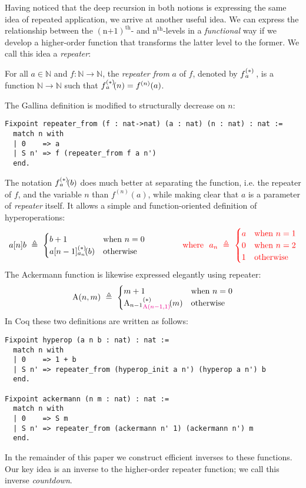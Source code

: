 Having noticed that the deep recursion in both notions is expressing the same idea
of repeated application, we arrive at another useful idea. We can express the relationship
between the $(\text{n+1})^{\text{th}}$- and $\text{n}^{\text{th}}$-levels in
a \emph{functional} way if we develop a higher-order function that transforms the latter level
to the former.  We call this idea a \emph{repeater}:
\begin{defn}
For all $a\in \mathbb{N}$ and $f: \mathbb{N}\to \mathbb{N}$, the \emph{repeater from} $a$ of $f$, denoted by $\rf{f}{a}$ , is a function $\mathbb{N}\to \mathbb{N}$ such that $\rf{f}{a}(n) = f^{(n)}(a)$.
\end{defn}
The Gallina definition is modified to structurally decrease on $n$:
\begin{lstlisting}
Fixpoint repeater_from (f : nat->nat) (a : nat) (n : nat) : nat :=
  match n with
  | 0    => a
  | S n' => f (repeater_from f a n')
  end.
\end{lstlisting}
The notation $\rf{f}{a}(b)$ does much better at separating the function, i.e. the repeater of $f$, and the variable $n$ than $f^{(n)}(a)$, while making clear that $a$ is a parameter of \emph{repeater} itself. It allows a simple and function-oriented definition of hyperoperations:
\begin{equation*}
a[n]b ~ \triangleq ~ \begin{cases}
b + 1 & \text{when } n = 0 \\
\rf{a[n-1]}{a_n}(b) & \text{otherwise}
\end{cases}
{\color{red}\qquad \qquad \text{ where } \ a_n ~ \triangleq ~ \begin{cases}
a & \text{when } n = 1 \\
0 & \text{when } n = 2 \\
1 & \text{otherwise}
\end{cases}}
\end{equation*}
The Ackermann function is likewise expressed elegantly using repeater:
\begin{equation*}
\Ack(n,m) ~ \triangleq ~ \begin{cases}
m + 1 & \text{when } n = 0 \\
\rf{\Ack_{n-1}}{\color{magenta}\Ack(n-1,1)}(m) & \text{otherwise}
\end{cases}
\end{equation*}
In Coq these two definitions are written as follows:
\begin{lstlisting}
Fixpoint hyperop (a n b : nat) : nat :=
  match n with
  | 0    => 1 + b
  | S n' => repeater_from (hyperop_init a n') (hyperop a n') b
  end.

Fixpoint ackermann (n m : nat) : nat :=
  match n with
  | 0    => S m
  | S n' => repeater_from (ackermann n' 1) (ackermann n') m
  end.
\end{lstlisting}
In the remainder of this paper we construct efficient inverses to these
functions.  Our key idea is an inverse to the higher-order repeater function; we call this inverse \emph{countdown}.

